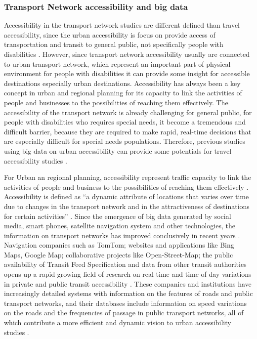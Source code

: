 \subsubsection{Transport Network accessibility and big data}
Accessibility in the transport network studies are different defined than travel 
accessibility, since the urban accessibility is focus on provide access of 
transportation and transit to general public, not specifically people with 
disabilities \cite{moya2016dynamic}. However, since transport network accessibility 
usually are connected to urban transport network, which represent an important 
part of physical environment for people with disabilities it can provide some insight for 
accessible destinations especially urban destinations. Accessibility has always been a key 
concept in urban and regional planning for its capacity to link the activities 
of people and businesses to the possibilities of reaching them effectively. 
The accessibility of the transport network is already challenging for general 
public, for people with disabilities who requires special needs, it become a 
tremendous and difficult barrier, because they are required to make rapid, 
real-time decisions that are especially difficult for special needs populations. 
Therefore, previous studies using big data on urban accessibility can provide 
some potentials for travel accessibility studies \cite{Barbeau}.

For Urban an regional planning, accessibility represent traffic capacity to link the 
activities of people and business to the possibilities of reaching them effectively 
\cite{moya2016dynamic}. Accessibility is defined as ``a dynamic attribute of locations
that varies over time due to changes in the transport network and in the attractiveness 
of destinations for certain activities'' \cite{moya2016dynamic}. Since the emergence of
big data generated by social media, smart phones, satellite navigation system and other 
technologies,  the information on transport networks has improved conclusively in recent 
years \cite{Barbeau}. Navigation companies such as TomTom; websites and applications 
like Bing Maps, Google Map; collaborative projects like Open-Street-Map; the public 
availability of Transit Feed Specification and data from other transit authorities 
opens up a rapid growing field of research on real time and time-of-day variations 
in private and public transit accessibility \cite{moya2016dynamic}. These companies 
and institutions have increasingly detailed systems with information on the features 
of roads and public transport networks, and their databases include information on 
speed variations on the roads and the frequencies of passage in public transport
networks, all of which contribute a more efficient and dynamic vision to urban 
accessibility studies \cite{moya2016dynamic}.

